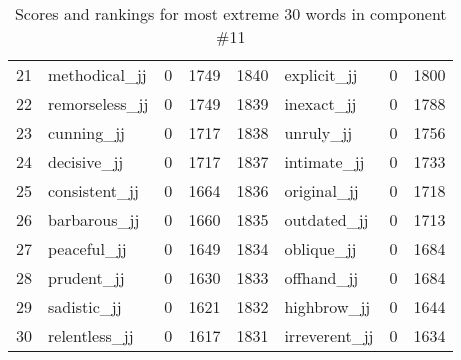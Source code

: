 \begin{table}[tbp]
\begin{tabular}{| rlr@{.}l | rlr@{.}l |}
    21 & methodical\_jj & 0 & 1749    &    1840 & explicit\_jj & 0 & 1800 \\
    22 & remorseless\_jj & 0 & 1749    &    1839 & inexact\_jj & 0 & 1788 \\
    23 & cunning\_jj & 0 & 1717    &    1838 & unruly\_jj & 0 & 1756 \\
    24 & decisive\_jj & 0 & 1717    &    1837 & intimate\_jj & 0 & 1733 \\
    25 & consistent\_jj & 0 & 1664    &    1836 & original\_jj & 0 & 1718 \\
    26 & barbarous\_jj & 0 & 1660    &    1835 & outdated\_jj & 0 & 1713 \\
    27 & peaceful\_jj & 0 & 1649    &    1834 & oblique\_jj & 0 & 1684 \\
    28 & prudent\_jj & 0 & 1630    &    1833 & offhand\_jj & 0 & 1684 \\
    29 & sadistic\_jj & 0 & 1621    &    1832 & highbrow\_jj & 0 & 1644 \\
    30 & relentless\_jj & 0 & 1617    &    1831 & irreverent\_jj & 0 & 1634 \\
    \hline
    \end{tabular}
    \caption{Scores and rankings for most extreme 30 words in component \#11} 
\end{table}
\clearpage
